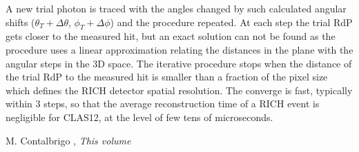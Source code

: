  A new trial photon is traced with the angles changed by such calculated angular shifts ($\theta_T + \Delta \theta$, $\phi_T + \Delta \phi$) and the procedure repeated. At each step the trial RdP gets closer to the measured hit, but an exact solution can not be found as the procedure uses a linear approximation relating the distances in the \MaPMT plane with the angular steps in the 3D space. The iterative procedure stops when the distance of the trial RdP to the measured hit is smaller than a fraction of the \MaPMT pixel size which defines the RICH detector spatial resolution. The converge is fast, typically within 3 steps, so that the average reconstruction time of a RICH event is negligible for CLAS12, at the level of few tens of microseconds.

\begin{thebibliography}{00}
 M. Contalbrigo \etal, {\em This volume}
\end{thebibliography}

